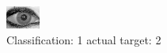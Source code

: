 \begin{figure}[h!]
\begin{center}
\includegraphics[width=0.60\columnwidth]{figures/ID2037_class_1_target_2.png}
\end{center}
\caption{ Classification: 1 actual target: 2}
\label{fig:ID2037_class_1_target_2}
\end{figure}
